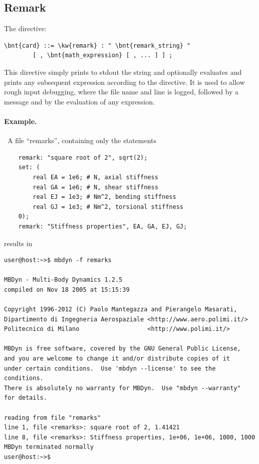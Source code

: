\subsection{Remark}
The  directive:
\begin{Verbatim}[commandchars=\\\{\}]
    \bnt{card} ::= \kw{remark} : " \bnt{remark_string} "
        [ , \bnt{math_expression} [ , ... ] ] ;
\end{Verbatim}
This directive simply prints to stdout the string  and
optionally evaluates and prints any subsequent expression 
according to the  directive.
It is used to allow rough input debugging, where the file name and line 
is logged, followed by a message and by the evaluation of any expression. 

\paragraph{Example.} \
A file ``remarks'', containing only the statements
\begin{verbatim}
    remark: "square root of 2", sqrt(2);
    set: (
        real EA = 1e6; # N, axial stiffness
        real GA = 1e6; # N, shear stiffness
        real EJ = 1e3; # Nm^2, bending stiffness
        real GJ = 1e3; # Nm^2, torsional stiffness
    0);
    remark: "Stiffness properties", EA, GA, EJ, GJ;
\end{verbatim}
results in
\begin{verbatim}
user@host:~>$ mbdyn -f remarks

MBDyn - Multi-Body Dynamics 1.2.5
compiled on Nov 18 2005 at 15:15:39

Copyright 1996-2012 (C) Paolo Mantegazza and Pierangelo Masarati,
Dipartimento di Ingegneria Aerospaziale <http://www.aero.polimi.it/>
Politecnico di Milano                   <http://www.polimi.it/>

MBDyn is free software, covered by the GNU General Public License,
and you are welcome to change it and/or distribute copies of it
under certain conditions.  Use 'mbdyn --license' to see the conditions.
There is absolutely no warranty for MBDyn.  Use "mbdyn --warranty"
for details.

reading from file "remarks"
line 1, file <remarks>: square root of 2, 1.41421
line 8, file <remarks>: Stiffness properties, 1e+06, 1e+06, 1000, 1000
MBDyn terminated normally
user@host:~>$
\end{verbatim}


